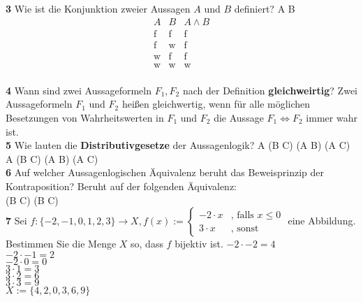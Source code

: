 \documentclass[11pt]{article}
\begin{document}
    \textbf{3} Wie ist die Konjunktion zweier Aussagen $A$ und $B$ definiert?\newline
    A \land B 
    \[
        \begin{array}{c|c|c}
            A & B & A \land B \\
            \hline
            \text{f} & \text{f} & \text{f} \\
            \text{f} & \text{w} & \text{f} \\
            \text{w} & \text{f} & \text{f} \\
            \text{w} & \text{w} & \text{w} \\
        \end{array}
    \]\newline\newline


    \textbf{4} Wann sind zwei Aussageformeln $F_1, F_2$ nach der Definition \textbf{gleichweirtig}?\newline
    Zwei Aussageformeln $F_1$ und $F_2$ heißen gleichwertig, wenn für alle möglichen Besetzungen von Wahrheitswerten in $F_1$ und $F_2$ die Aussage $F_1 \Leftrightarrow F_2$ immer wahr ist.\\

    \textbf{5} Wie lauten die \textbf{Distributivgesetze} der Aussagenlogik?\newline
    A \land (B \lor C) \iff (A \land B) \lor (A \land C)\\
    A \lor (B \land C) \iff (A \lor B) \land (A \lor C)\\


\textbf{6} Auf welcher Aussagenlogischen Äquivalenz beruht das Beweisprinzip der Kontraposition?\newline
    Beruht auf der folgenden Äquivalenz:\\
    (B \Rightarrow C) \Leftrightarrow (\neg B \Leftarrow \neg C)\\

    \textbf{7} Sei $f : \{-2,-1,0,1,2,3\} \rightarrow X, f(x) :=  \begin{cases}
                                                                    -2 \cdot x & \text{, falls $x \leq 0$} \\
                                                                    3 \cdot x & \text{, sonst}
    \end{cases}$ eine Abbildung. Bestimmen Sie die Menge $X$ so, dass $f$ bijektiv ist.\newline
    $-2 \cdot -2 = 4$\\
    $-2 \cdot -1 = 2$\\
    $-2 \cdot 0 = 0$\\
    $3 \cdot 1 = 3$\\
    $3 \cdot 2 = 6$\\
    $3 \cdot 3 = 9$\\
    $X := \{4,2,0,3,6,9\}$\\
\end{document}
